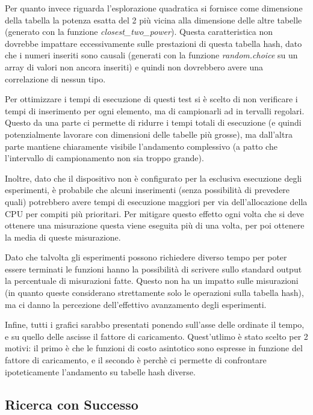 \documentclass{article}
\begin{document}
Per quanto invece riguarda l'esplorazione quadratica si fornisce come dimensione della tabella la potenza esatta del 2 più vicina alla dimensione delle altre tabelle (generato con la funzione \emph{closest\_two\_power}). Questa caratteristica non dovrebbe impattare eccessivamente sulle prestazioni di questa tabella hash, dato che i numeri inseriti sono causali (generati con la funzione \emph{random.choice} su un array di valori non ancora inseriti) e quindi non dovrebbero avere una correlazione di nessun tipo.

Per ottimizzare i tempi di esecuzione di questi test si è scelto di non verificare i tempi di inserimento per ogni elemento, ma di campionarli ad in tervalli regolari. Questo da una parte ci permette di ridurre i tempi totali di esecuzione (e quindi potenzialmente lavorare con dimensioni delle tabelle più grosse), ma dall'altra parte mantiene chiaramente visibile l'andamento complessivo (a patto che l'intervallo di campionamento non sia troppo grande).

Inoltre, dato che il dispositivo non è configurato per la esclusiva esecuzione degli esperimenti, è probabile che alcuni inserimenti (senza possibilità di prevedere quali) potrebbero avere tempi di esecuzione maggiori per via dell'allocazione della CPU per compiti più prioritari. Per mitigare questo effetto ogni volta che si deve ottenere una misurazione questa viene eseguita più di una volta, per poi ottenere la media di queste misurazione.

Dato che talvolta gli esperimenti possono richiedere diverso tempo per poter essere terminati le funzioni hanno la possibilità di scrivere sullo standard output la percentuale di misurazioni fatte. Questo non ha un impatto sulle misurazioni (in quanto queste considerano strettamente solo le operazioni sulla tabella hash), ma ci danno la percezione dell'effettivo avanzamento degli esperimenti.

Infine, tutti i grafici sarabbo presentati ponendo sull'asse delle ordinate il tempo, e su quello delle ascisse il fattore di caricamento. Quest'utlimo è stato scelto per 2 motivi: il primo è che le funzioni di costo asintotico sono espresse in funzione del fattore di caricamento, e il secondo è perchè ci permette di confrontare ipoteticamente l'andamento su tabelle hash diverse. 

\subsection{Ricerca con Successo}
\end{document}
